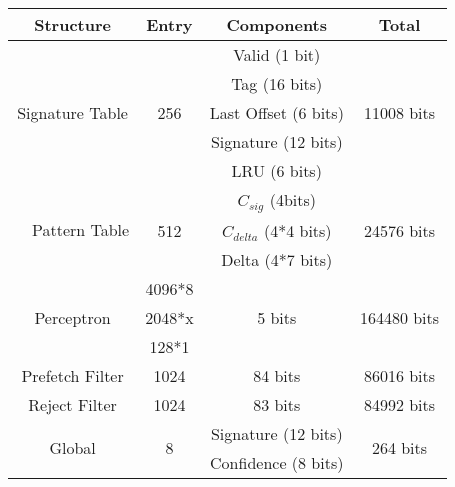 \begin{table}[]
    \centering
    \begin{tabular}{|c|c|c|c|}
    \hline
        \textbf{Structure} &
        \textbf{Entry} &
        \textbf{Components} &
        \textbf{Total} \\
    \hline
        \multirow{5}{2.2cm}{Signature Table} &      & Valid (1 bit)        &             \\
                                             &      & Tag (16 bits)        &             \\
                                             & 256  & Last Offset (6 bits) & 11008 bits  \\  
                                             &      & Signature (12 bits)  &             \\
                                             &      & LRU (6 bits)         &             \\
    \hline
        \multirow{3}{2.2cm}{~~Pattern Table} &      & $C_{sig}$ (4bits)      &               \\
                                             & 512  & $C_{delta}$ (4*4 bits) & 24576 bits    \\
                                             &      & Delta (4*7 bits)       &               \\
    \hline
        \multirow{3}{1.5cm}{Perceptron\newline}     & 4096*8    &            &              \\
        \multirow{2}{0.9cm}{Tables}                 & 2048*x    & 5 bits     & 164480 bits  \\
                                                    & 128*1     &            &              \\
    \hline
        Prefetch Filter\footnotemark[1]             & 1024      & 84 bits    & 86016 bits   \\
    \hline
        Reject Filter\footnotemark[2]               & 1024      & 83 bits    & 84992 bits   \\
    \hline
        \multirow{4}{1cm}{Global\newline\newline}   & \multirow{4}{0.2cm}{8} & Signature (12 bits)  & \multirow{4}{1.1cm}{264 bits} \\
        \multirow{3}{1.1cm}{History\newline}        &                        & Confidence (8 bits)  &                               \\

\end{tabular}
\end{table}
